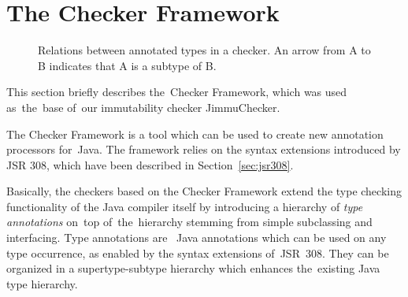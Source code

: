 \documentclass{pracamgr}
\theoremstyle{break}
\theoremstyle{break}
\theoremstyle{break}
\begin{document}
\section{The Checker Framework}
\label{sec:framework}

\begin{figure}
  \centering
  
  \caption{Relations between annotated types in a checker. An arrow from
    A to B indicates that A is a subtype of B.}
  \label{fig:example-checker-hierarchy}
\end{figure}

This section briefly describes the~Checker Framework, which was used
as~the~base of~our immutability checker JimmuChecker.

The Checker Framework is a tool which can be used to create new
annotation processors for~Java. The framework relies on the syntax
extensions introduced by JSR 308, which have been described in
Section~\ref{sec:jsr308}. 

Basically, the checkers based on the Checker Framework extend the
type checking functionality of the Java compiler itself by introducing
a hierarchy of \emph{type annotations} on~top of~the~hierarchy
stemming from simple subclassing and interfacing. Type annotations
are~ Java annotations which can be used on any type occurrence, as
enabled by the syntax extensions of~JSR~308. They can be organized in
a supertype-subtype hierarchy which enhances the~existing Java type
hierarchy.
\end{document}
